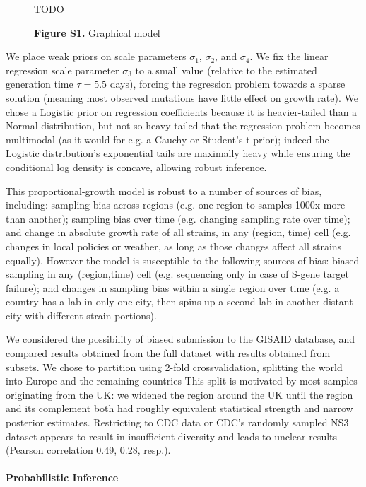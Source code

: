 \documentclass[12pt]{article}
\begin{document}
\begin{figure*}
TODO
\caption{\textbf{Figure S1.} Graphical model}
\end{figure*}

We place weak priors on scale parameters $\sigma_1$, $\sigma_2$, and $\sigma_4$.
We fix the linear regression scale parameter $\sigma_3$ to a small value (relative to the estimated generation time $\tau=5.5$ days), forcing the regression problem towards a sparse solution (meaning most observed mutations have little effect on growth rate).
We chose a Logistic prior on regression coefficients because it is heavier-tailed than a Normal distribution, but not so heavy tailed that the regression problem becomes multimodal (as it would for e.g. a Cauchy or Student's t prior); indeed the Logistic distribution's exponential tails are maximally heavy while ensuring the conditional log density is concave, allowing robust inference.

This proportional-growth model is robust to a number of sources of bias, including:
sampling bias across regions (e.g. one region to samples 1000x more than another);
sampling bias over time (e.g. changing sampling rate over time); and
change in absolute growth rate of all strains, in any (region, time) cell (e.g. changes in local policies or weather, as long as those changes affect all strains equally).
However the model is susceptible to the following sources of bias:
biased sampling in any (region,time) cell (e.g. sequencing only in case of S-gene target failure); and changes in sampling bias within a single region over time (e.g. a country has a lab in only one city, then spins up a second lab in another distant city with different strain portions).

We considered the possibility of biased submission to the GISAID database, and compared results obtained from the full dataset with results obtained from subsets.
We chose to partition using 2-fold crossvalidation, splitting the world into Europe and the remaining countries
This split is motivated by most samples originating from the UK: we widened the region around the UK until the region and its complement both had roughly equivalent statistical strength and narrow posterior estimates.
Restricting to CDC data or CDC's randomly sampled NS3 dataset appears to result in insufficient diversity and leads to unclear results (Pearson correlation 0.49, 0.28, resp.).

\paragraph*{Probabilistic Inference}
\end{document}
